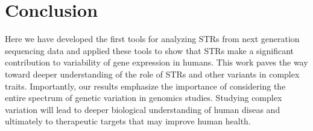\section{Conclusion}
Here we have developed the first tools for analyzing STRs from next generation sequencing data and applied these tools to show that STRs make a significant contribution to variability of gene expression in humans. This work paves the way toward deeper understanding of the role of STRs and other variants in complex traits. Importantly, our results emphasize the importance of considering the entire spectrum of genetic variation in genomics studies. Studying complex variation will lead to deeper biological understanding of human diseas and ultimately to therapeutic targets that may improve human health.